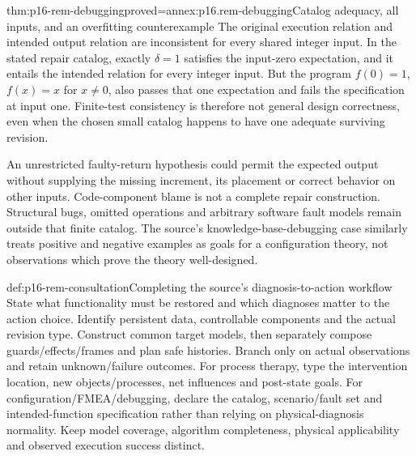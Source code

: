 \begin{hbtheorem}{thm:p16-rem-debugging}{proved=annex:p16.rem-debugging}{Catalog adequacy, all inputs, and an overfitting counterexample}
The original execution relation and intended output relation are inconsistent
for every shared integer input. In the stated repair catalog, exactly
\(\delta=1\) satisfies the input-zero expectation, and it entails the
intended relation for every integer input. But the program
\(f(0)=1\), \(f(x)=x\) for \(x\ne0\), also passes that one
expectation and fails the specification at input one. Finite-test consistency
is therefore not general design correctness, even when the chosen small
catalog happens to have one adequate surviving revision.
\end{hbtheorem}

An unrestricted faulty-return hypothesis could permit the expected output
without supplying the missing increment, its placement or correct behavior
on other inputs. Code-component blame is not a complete repair construction.
Structural bugs, omitted operations and arbitrary software fault models
remain outside that finite catalog. The source's knowledge-base-debugging
case similarly treats positive and negative examples as goals for a
configuration theory, not observations which prove the theory well-designed.

\begin{hbmethod}{def:p16-rem-consultation}{Completing the source's diagnosis-to-action workflow}
State what functionality must be restored and which diagnoses matter to
the action choice. Identify persistent data, controllable components and
the actual revision type. Construct common target models, then separately
compose guards/effects/frames and plan safe histories. Branch only on
actual observations and retain unknown/failure outcomes. For process therapy,
type the intervention location, new objects/processes, net influences and
post-state goals. For configuration/FMEA/debugging, declare the catalog,
scenario/fault set and intended-function specification rather than relying
on physical-diagnosis normality. Keep model coverage, algorithm completeness,
physical applicability and observed execution success distinct.
\end{hbmethod}

